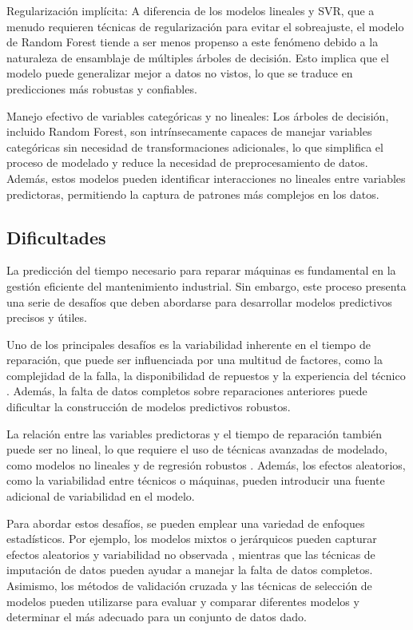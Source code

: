 \documentclass[
  11pt,
  bookmarksnumbered]{article}
\begin{document}
Regularización implícita: A diferencia de los modelos lineales y SVR, que a menudo requieren técnicas de regularización para evitar el sobreajuste, el modelo de Random Forest tiende a ser menos propenso a este fenómeno debido a la naturaleza de ensamblaje de múltiples árboles de decisión.
Esto implica que el modelo puede generalizar mejor a datos no vistos, lo que se traduce en predicciones más robustas y confiables.

Manejo efectivo de variables categóricas y no lineales: Los árboles de decisión, incluido Random Forest, son intrínsecamente capaces de manejar variables categóricas sin necesidad de transformaciones adicionales, lo que simplifica el proceso de modelado y reduce la necesidad de preprocesamiento de datos.
Además, estos modelos pueden identificar interacciones no lineales entre variables predictoras, permitiendo la captura de patrones más complejos en los datos.

\newpage

\hypertarget{dificultades}{%
\subsection{Dificultades}\label{dificultades}}

La predicción del tiempo necesario para reparar máquinas es fundamental en la gestión eficiente del mantenimiento industrial.
Sin embargo, este proceso presenta una serie de desafíos que deben abordarse para desarrollar modelos predictivos precisos y útiles.

Uno de los principales desafíos es la variabilidad inherente en el tiempo de reparación, que puede ser influenciada por una multitud de factores, como la complejidad de la falla, la disponibilidad de repuestos y la experiencia del técnico \textcite{montgomery2012introduction}.
Además, la falta de datos completos sobre reparaciones anteriores puede dificultar la construcción de modelos predictivos robustos.

La relación entre las variables predictoras y el tiempo de reparación también puede ser no lineal, lo que requiere el uso de técnicas avanzadas de modelado, como modelos no lineales y de regresión robustos \textcite{gelman2013bayesian}.
Además, los efectos aleatorios, como la variabilidad entre técnicos o máquinas, pueden introducir una fuente adicional de variabilidad en el modelo.

Para abordar estos desafíos, se pueden emplear una variedad de enfoques estadísticos.
Por ejemplo, los modelos mixtos o jerárquicos pueden capturar efectos aleatorios y variabilidad no observada \textcite{agresti2015foundations}, mientras que las técnicas de imputación de datos pueden ayudar a manejar la falta de datos completos.
Asimismo, los métodos de validación cruzada y las técnicas de selección de modelos pueden utilizarse para evaluar y comparar diferentes modelos y determinar el más adecuado para un conjunto de datos dado.
\end{document}
